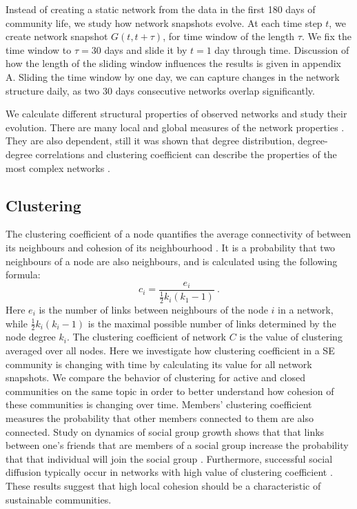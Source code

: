 Instead of creating a static network from the data in the first 180 days of community life, we study how network snapshots evolve. At each time step $t$, we create network snapshot $G(t, t+\tau)$, for time window of the length $\tau$. We fix the time window to $\tau=30$ days and slide it by $t=1$ day through time. Discussion of how the length of the sliding window influences the results is given in appendix A. Sliding the time window by one day, we can capture changes in the network structure daily, as two 30 days consecutive networks overlap significantly. 

We calculate different structural properties of observed networks and study their evolution. There are many local and global measures of the network properties \cite{boccaletti2006complex}. They are also dependent, still it was shown that degree distribution, degree-degree correlations and clustering coefficient can describe the properties of the most complex networks \cite{orsini2015quantifying}. 


        



\subsection{Clustering}
The clustering coefficient of a node quantifies the average connectivity of between its neighbours and cohesion of its neighbourhood \cite{boccaletti2006complex}. It is a probability that two neighbours of a node are also neighbours, and is calculated using the following formula:
\begin{equation}
c_{i}=\frac{e_{i}}{\frac{1}{2}k_{i}(k_{1}-1)} \ .
\label{eq:clust}
\end{equation}
Here $e_{i}$ is the number of links between neighbours of the node $i$ in a network, while $\frac{1}{2}k_{i}(k_{i}-1)$ is the maximal possible number of links determined by the node degree $k_{i}$. The clustering coefficient of network $C$ is the value of clustering averaged over all nodes. Here we investigate how clustering coefficient in a SE community is changing with time by calculating its value for all network snapshots. We compare the behavior of clustering for active and closed communities on the same topic in order to better understand how cohesion of these communities is changing over time. 
Members' clustering coefficient measures the probability that other members connected to them are also connected. Study on dynamics of social group growth shows that that links between one's friends that are members of a social group increase the probability that that individual will join the social group \cite{backstrom2006group}. Furthermore, successful social diffusion  typically occur in networks with high value of clustering coefficient \cite{centola2007cascade}. These results suggest that high local cohesion should be a characteristic of sustainable communities.

